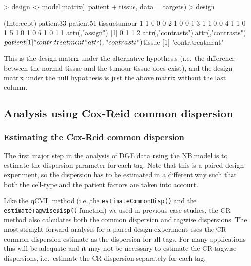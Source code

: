 \begin{Schunk}
\begin{Sinput}
> design <- model.matrix(~patient + tissue, data = targets)
> design
\end{Sinput}
\begin{Soutput}
  (Intercept) patient33 patient51 tissuetumour
1           1         0         0            0
2           1         0         0            1
3           1         1         0            0
4           1         1         0            1
5           1         0         1            0
6           1         0         1            1
attr(,"assign")
[1] 0 1 1 2
attr(,"contrasts")
attr(,"contrasts")$patient
[1] "contr.treatment"

attr(,"contrasts")$tissue
[1] "contr.treatment"
\end{Soutput}
\end{Schunk}

This is the design matrix under the alternative hypothesis (i.e.~the
difference between the normal tissue and the tumour tissue does
exist), and the design matrix under the null hypothesis is just the
above matrix without the last column.


\subsection{Analysis using Cox-Reid common dispersion}

\subsubsection{Estimating the Cox-Reid common dispersion}

The first major step in the analysis of DGE data using the NB model is
to estimate the dispersion parameter for each tag. Note that this is a
paired design experiment, so the dispersion has to be estimated in a
different way such that both the cell-type and the patient factors are
taken into account.

Like the qCML method (i.e.,the \texttt{estimateCommonDisp()} and the
\texttt{estimateTagwiseDisp()} function) we used in previous case
studies, the CR method also calculates both the common dispersion and
tagwise dispersions. The most straight-forward analysis for a paired
design experiment uses the CR common dispersion estimate as the
dispersion for all tags. For many applications this will be adequate
and it may not be necessary to estimate the CR tagwise dispersions,
i.e.~estimate the CR dispersion separately for each tag.

